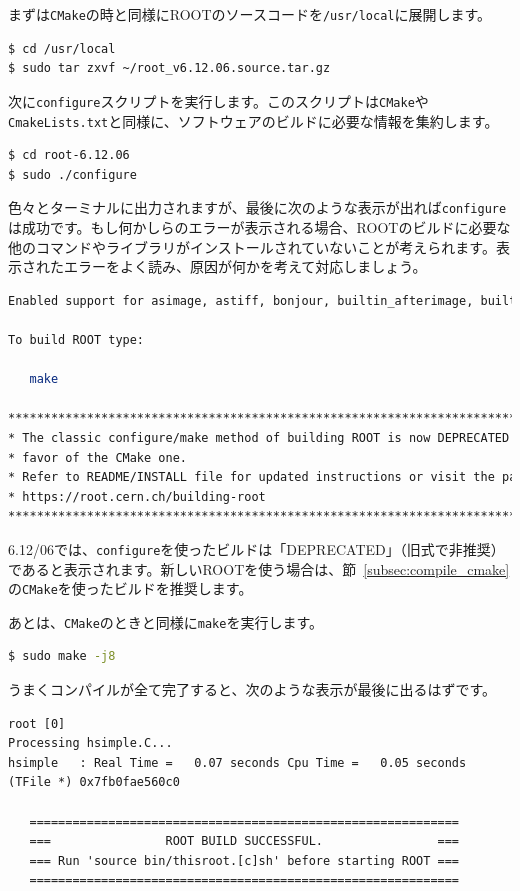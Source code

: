 まずは\texttt{CMake}の時と同様にROOTのソースコードを\texttt{/usr/local}に展開します。
\begin{lstlisting}[language=bash]
$ cd /usr/local
$ sudo tar zxvf ~/root_v6.12.06.source.tar.gz
\end{lstlisting}

次に\texttt{configure}スクリプトを実行します。このスクリプトは\texttt{CMake}や\texttt{CmakeLists.txt}と同様に、ソフトウェアのビルドに必要な情報を集約します。

\begin{lstlisting}[language=bash]
$ cd root-6.12.06
$ sudo ./configure
\end{lstlisting}

色々とターミナルに出力されますが、最後に次のような表示が出れば\texttt{configure}は成功です。もし何かしらのエラーが表示される場合、ROOTのビルドに必要な他のコマンドやライブラリがインストールされていないことが考えられます。表示されたエラーをよく読み、原因が何かを考えて対応しましょう。
\begin{lstlisting}[language=bash]
Enabled support for asimage, astiff, bonjour, builtin_afterimage, builtin_ftgl, builtin_freetype, builtin_gl2ps, builtin_glew, builtin_unuran, builtin_lz4, builtin_llvm, libcxx, cocoa, explicitlink, fink, fitsio, gviz, genvector, krb5, ldap, memstat, opengl, python, rpath, search_usrlocal, shared, sqlite, tmva, xml.

To build ROOT type:

   make 

******************************************************************************
* The classic configure/make method of building ROOT is now DEPRECATED in    *
* favor of the CMake one.                                                    *
* Refer to README/INSTALL file for updated instructions or visit the page    *
* https://root.cern.ch/building-root                                         *
******************************************************************************
\end{lstlisting}
6.12/06では、\texttt{configure}を使ったビルドは「DEPRECATED」（旧式で非推奨）であると表示されます。新しいROOTを使う場合は、節~\ref{subsec:compile_cmake}の\texttt{CMake}を使ったビルドを推奨します。

あとは、\texttt{CMake}のときと同様に\texttt{make}を実行します。
\begin{lstlisting}[language=bash]
$ sudo make -j8
\end{lstlisting}
うまくコンパイルが全て完了すると、次のような表示が最後に出るはずです。
\begin{lstlisting}
root [0] 
Processing hsimple.C...
hsimple   : Real Time =   0.07 seconds Cpu Time =   0.05 seconds
(TFile *) 0x7fb0fae560c0
 
   ============================================================
   ===                ROOT BUILD SUCCESSFUL.                ===
   === Run 'source bin/thisroot.[c]sh' before starting ROOT ===
   ============================================================
\end{lstlisting}

